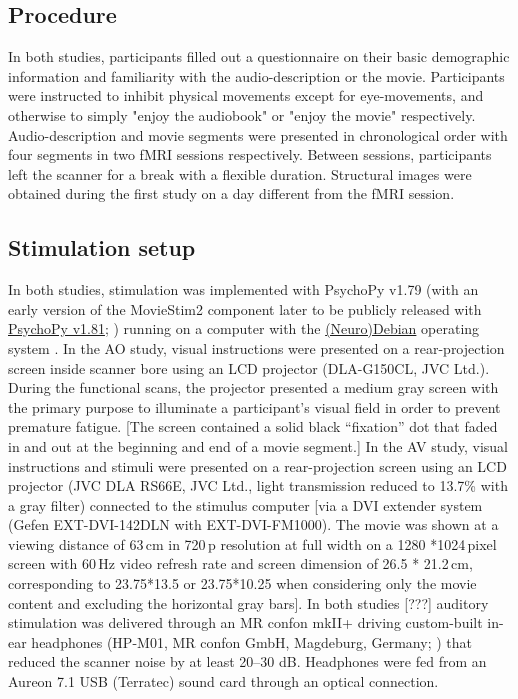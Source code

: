 \documentclass[english]{article}
\begin{document}
\subsection{Procedure}
In both studies, participants filled out a questionnaire on their basic demographic information and familiarity with the audio-description or the movie.
Participants were instructed to inhibit physical movements except for eye-movements, and otherwise to simply "enjoy the audiobook" or "enjoy the movie" respectively.
Audio-description and movie segments were presented in chronological order with four segments in two fMRI sessions respectively.
Between sessions, participants left the scanner for a break with a flexible duration. Structural images were obtained during the first study on a day different from the fMRI session.


\subsection{Stimulation setup}
In both studies, stimulation was implemented with PsychoPy v1.79 (with an early version of the MovieStim2 component later to be publicly released with \href{http://www.psychopy.org}{PsychoPy v1.81}; \citep{peirce2007psychopy}) running on a computer with the \href{http://neuro.debian.net}{(Neuro)Debian} operating system \citep{halchenko2012open}.
In the AO study, visual instructions were presented on a rear-projection screen inside scanner bore using an LCD projector (DLA-G150CL, JVC Ltd.).
During the functional scans, the projector presented a medium gray screen with the primary purpose to illuminate a participant’s visual field in order to prevent premature fatigue.
[The screen contained a solid black ``fixation'' dot that faded in and out at the beginning and end of a movie segment.]
In the AV study, visual instructions and stimuli were presented on a rear-projection screen using an LCD projector (JVC DLA RS66E, JVC Ltd., light transmission reduced to 13.7\% with a gray filter) connected to the stimulus computer [via a DVI extender system (Gefen EXT-DVI-142DLN with EXT-DVI-FM1000).
The movie was shown at a viewing distance of 63\,cm in 720\,p resolution at full width on a 1280 *1024\,pixel screen with 60\,Hz video refresh rate and screen dimension of 26.5 * 21.2\,cm, corresponding to 23.75*13.5 or 23.75*10.25 when considering only the movie content and excluding the horizontal gray bars].
In both studies [???] auditory stimulation was delivered through an MR confon mkII+ driving custom-built in-ear headphones (HP-M01, MR confon GmbH, Magdeburg, Germany; \citep{baumgart1998electrodynamic}) that reduced the scanner noise by at least 20–30 dB.
Headphones were  fed from an Aureon 7.1 USB (Terratec) sound card through an optical connection.
\end{document}
